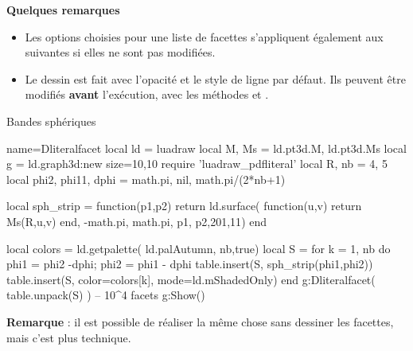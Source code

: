 \textbf{Quelques remarques}
\begin{itemize}
    \item  Les options choisies pour une liste de facettes s'appliquent également aux suivantes si elles ne sont pas modifiées.
    \item Le dessin est fait avec l'opacité et le style de ligne par défaut. Ils peuvent être modifiés \textbf{avant} l'exécution, avec les méthodes  et .
\end{itemize}

\begin{demo}{Bandes sphériques}
\begin{luadraw}{name=Dliteralfacet}
local ld = luadraw
local M, Ms = ld.pt3d.M, ld.pt3d.Ms
local g = ld.graph3d:new{ size={10,10} }
require 'luadraw_pdfliteral'
local R, nb = 4, 5
local phi2, phi11, dphi = math.pi, nil, math.pi/(2*nb+1)

local sph_strip = function(p1,p2)
    return ld.surface( function(u,v) return Ms(R,u,v) end, -math.pi, math.pi, p1, p2,{201,11})
end

local colors = ld.getpalette( ld.palAutumn, nb,true)
local S = {}
for k = 1, nb do
    phi1 = phi2 -dphi; phi2 = phi1 - dphi
    table.insert(S, sph_strip(phi1,phi2))
    table.insert(S, {color=colors[k], mode=ld.mShadedOnly})
end
g:Dliteralfacet( table.unpack(S) ) -- 10^4 facets
g:Show()
\end{luadraw}
\end{demo}

\textbf{Remarque} : il est possible de réaliser la même chose sans dessiner les facettes, mais c'est  plus technique.
